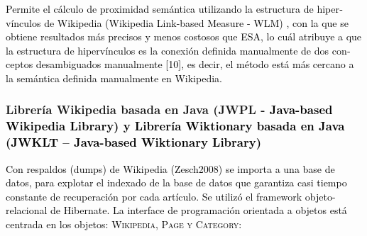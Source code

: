 \documentclass[letterpaper]{article}
\newcommand\textstylebibuscitbase[1]{#1}
\begin{document}
\bigskip

{\sffamily
\textstylebibuscitbase{\foreignlanguage{spanish}{\textcolor{black}{Permite
el c\'alculo de proximidad sem\'antica utilizando la estructura de
hiperv\'inculos de Wikipedia (Wikipedia Link-based Measure - WLM) , con
la que se obtiene resultados m\'as precisos y menos costosos que ESA,
lo cu\'al atribuye a que la estructura de hiperv\'inculos es la
conexi\'on definida manualmente de dos conceptos desambiguados
manualmente [10], es decir, el m\'etodo est\'a m\'as cercano a la
sem\'antica definida manualmente en Wikipedia.}}}}


\bigskip

\subsubsection[Librer\'ia Wikipedia basada en Java (JWPL {}-
Java{}-based Wikipedia Library) y Librer\'ia Wiktionary basada en Java
(JWKLT {}-- Java{}-based Wiktionary Library)]{Librer\'ia Wikipedia
basada en Java (JWPL {}- \textcolor{black}{Java-based Wikipedia
Library) y Librer\'ia Wiktionary basada en Java (JWKLT -- Java-based
Wiktionary Library)}}
\hypertarget{RefHeading10808782078703}{}
\bigskip

{\sffamily
\textcolor{black}{Con respaldos (dumps) de Wikipedia
}\textstylebibuscitbase{\textcolor{black}{(Zesch2008)}}\textcolor{black}{
se importa a una base de datos, para explotar el indexado
}\textcolor{black}{de}\textcolor{black}{ la base de datos que garantiza
casi tiempo }\textcolor{black}{constante de recuperaci\'on por cada
art\'iculo. Se utiliz\'o el framework objeto-relacional de Hibernate.
La interface de programaci\'on orientada a objetos est\'a
}\textcolor{black}{centrada en los objetos:
W}\textsc{\textcolor{black}{ikipedia, Page y
Category}}\textcolor{black}{:}}


\bigskip
\end{document}
